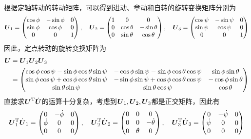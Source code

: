 根据定轴转动的转动矩阵，可以得到进动、章动和自转的旋转变换矩阵分别为
\begin{equation*}
	\boldsymbol{U}_1 = \begin{pmatrix} \cos \phi & -\sin \phi & 0 \\ \sin \phi & \cos \phi & 0 \\ 0 & 0 & 1 \end{pmatrix},\quad \boldsymbol{U}_2 = \begin{pmatrix} 1 & 0 & 0 \\ 0 & \cos \theta & -\sin \theta \\ 0 & \sin \theta & \cos \theta \end{pmatrix},\quad \boldsymbol{U}_3 = \begin{pmatrix} \cos \psi & -\sin \psi & 0 \\ \sin \psi & \cos \psi & 0 \\ 0 & 0 & 1 \end{pmatrix}
\end{equation*}
因此，定点转动的旋转变换矩阵为
\begin{align}
	\boldsymbol{U} & = \boldsymbol{U}_1 \boldsymbol{U}_2 \boldsymbol{U}_3 \nonumber \\
	& = \begin{pmatrix}
		\cos \phi \cos \psi - \sin \phi \cos \theta \sin \psi & -\cos \phi \sin \psi - \sin \phi \cos \theta \cos \psi & \sin \phi \sin \theta \\
		\sin \phi \cos \psi + \cos \phi \cos \theta \sin \psi & -\sin \phi \sin \psi + \cos \phi \cos \theta \cos \psi & -\cos \phi \sin \theta \\
		\sin \theta \sin \psi & \sin \theta \cos \psi & \cos \theta
	\end{pmatrix}
	\label{chapter6:定点转动的变换矩阵}
\end{align}
直接求$\boldsymbol{U}^{\mathrm{T}} \dot{\boldsymbol{U}}$的运算十分复杂，考虑到$\boldsymbol{U}_1,\boldsymbol{U}_2,\boldsymbol{U}_3$都是正交矩阵，因此有
\begin{equation*}
	\boldsymbol{U}_1^{\mathrm{T}} \dot{\boldsymbol{U}}_1 = \begin{pmatrix} 0 & -\dot{\phi} & 0 \\ \dot{\phi} & 0 & 0 \\ 0 & 0 & 0 \end{pmatrix},\quad \boldsymbol{U}_2^{\mathrm{T}} \dot{\boldsymbol{U}}_2 = \begin{pmatrix} 0 & 0 & 0 \\ 0 & 0 & -\dot{\theta} \\ 0 & \dot{\theta} & 0 \end{pmatrix},\quad \boldsymbol{U}_3^{\mathrm{T}} \dot{\boldsymbol{U}}_3 = \begin{pmatrix} 0 & -\dot{\psi} & 0 \\ \dot{\psi} & 0 & 0 \\ 0 & 0 & 0 \end{pmatrix}
\end{equation*}
